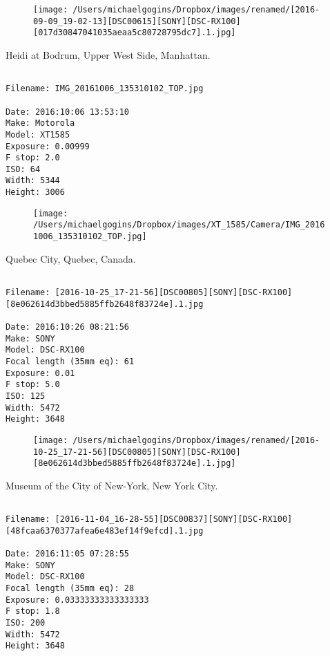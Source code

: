 \begin{figure}
\texttt{[image: /Users/michaelgogins/Dropbox/images/renamed/[2016-09-09\_19-02-13][DSC00615][SONY][DSC-RX100][017d30847041035aeaa5c80728795dc7].1.jpg]}
\end{figure}
    
\clearpage
\onecolumn
\noindent Heidi at Bodrum, Upper West Side, Manhattan.
\noindent
\begin{lstlisting}

Filename: IMG_20161006_135310102_TOP.jpg

Date: 2016:10:06 13:53:10
Make: Motorola
Model: XT1585
Exposure: 0.00999
F stop: 2.0
ISO: 64
Width: 5344
Height: 3006
\end{lstlisting}
\clearpage

\begin{figure}
\texttt{[image: /Users/michaelgogins/Dropbox/images/XT\_1585/Camera/IMG\_20161006\_135310102\_TOP.jpg]}
\end{figure}
    
\clearpage
\onecolumn
\noindent Quebec City, Quebec, Canada.
\noindent
\begin{lstlisting}

Filename: [2016-10-25_17-21-56][DSC00805][SONY][DSC-RX100][8e062614d3bbed5885ffb2648f83724e].1.jpg

Date: 2016:10:26 08:21:56
Make: SONY
Model: DSC-RX100
Focal length (35mm eq): 61
Exposure: 0.01
F stop: 5.0
ISO: 125
Width: 5472
Height: 3648
\end{lstlisting}
\clearpage

\begin{figure}
\texttt{[image: /Users/michaelgogins/Dropbox/images/renamed/[2016-10-25\_17-21-56][DSC00805][SONY][DSC-RX100][8e062614d3bbed5885ffb2648f83724e].1.jpg]}
\end{figure}
    
\clearpage
\onecolumn
\noindent Museum of the City of New-York, New York City.
\noindent
\begin{lstlisting}

Filename: [2016-11-04_16-28-55][DSC00837][SONY][DSC-RX100][48fcaa6370377afea6e483ef14f9efcd].1.jpg

Date: 2016:11:05 07:28:55
Make: SONY
Model: DSC-RX100
Focal length (35mm eq): 28
Exposure: 0.03333333333333333
F stop: 1.8
ISO: 200
Width: 5472
Height: 3648
\end{lstlisting}
\clearpage

